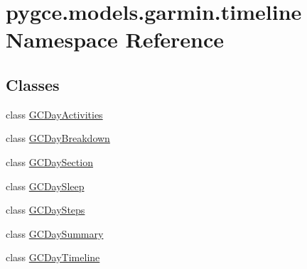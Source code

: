 \hypertarget{namespacepygce_1_1models_1_1garmin_1_1timeline}{}\section{pygce.\+models.\+garmin.\+timeline Namespace Reference}
\label{namespacepygce_1_1models_1_1garmin_1_1timeline}
\subsection*{Classes}
\begin{DoxyCompactItemize}
\item 
class \hyperlink{classpygce_1_1models_1_1garmin_1_1timeline_1_1_g_c_day_activities}{G\+C\+Day\+Activities}
\item 
class \hyperlink{classpygce_1_1models_1_1garmin_1_1timeline_1_1_g_c_day_breakdown}{G\+C\+Day\+Breakdown}
\item 
class \hyperlink{classpygce_1_1models_1_1garmin_1_1timeline_1_1_g_c_day_section}{G\+C\+Day\+Section}
\item 
class \hyperlink{classpygce_1_1models_1_1garmin_1_1timeline_1_1_g_c_day_sleep}{G\+C\+Day\+Sleep}
\item 
class \hyperlink{classpygce_1_1models_1_1garmin_1_1timeline_1_1_g_c_day_steps}{G\+C\+Day\+Steps}
\item 
class \hyperlink{classpygce_1_1models_1_1garmin_1_1timeline_1_1_g_c_day_summary}{G\+C\+Day\+Summary}
\item 
class \hyperlink{classpygce_1_1models_1_1garmin_1_1timeline_1_1_g_c_day_timeline}{G\+C\+Day\+Timeline}
\end{DoxyCompactItemize}

